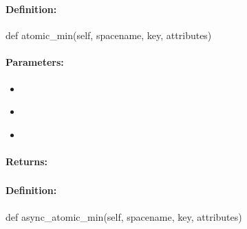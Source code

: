 \subsubsection{}
\label{api:python:atomic_min}


\paragraph{Definition:}
\begin{pythoncode}
def atomic_min(self, spacename, key, attributes)
\end{pythoncode}

\paragraph{Parameters:}
\begin{itemize}[noitemsep]
\item {}\\

\item {}\\

\item {}\\

\end{itemize}

\paragraph{Returns:}


\pagebreak
\subsubsection{}
\label{api:python:async_atomic_min}


\paragraph{Definition:}
\begin{pythoncode}
def async_atomic_min(self, spacename, key, attributes)
\end{pythoncode}

